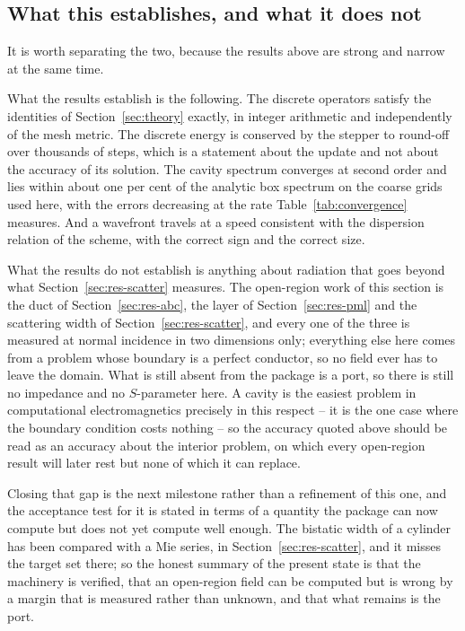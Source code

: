 \subsection{What this establishes, and what it does not}
\label{sec:res-scope}

It is worth separating the two, because the results above are strong and narrow at the same time.

What the results establish is the following. The discrete operators satisfy the identities of
Section~\ref{sec:theory} exactly, in integer arithmetic and independently of the mesh metric. The discrete
energy is conserved by the stepper to round-off over thousands of steps, which is a statement about the update
and not about the accuracy of its solution. The cavity spectrum converges at second order and lies within about
one per cent of the analytic box spectrum on the coarse grids used here, with the errors decreasing
at the rate Table~\ref{tab:convergence} measures. And a wavefront travels at a speed consistent with the
dispersion relation of the scheme, with the correct sign and the correct size.

What the results do not establish is anything about radiation that goes beyond what
Section~\ref{sec:res-scatter} measures. The open-region work of this section is the duct of
Section~\ref{sec:res-abc}, the layer of Section~\ref{sec:res-pml} and the scattering width of
Section~\ref{sec:res-scatter}, and every one of the three is measured at normal incidence in two dimensions only;
everything else here comes from a problem whose boundary is a perfect conductor, so no field ever has to leave the
domain. What is still absent from the package is a port, so there is still no impedance and no $S$-parameter
here. A cavity is the easiest problem in computational
electromagnetics precisely in this respect -- it is the one case where the boundary condition costs nothing --
so the accuracy quoted above should be read as an accuracy about the interior problem, on which every
open-region result will later rest but none of which it can replace.

Closing that gap is the next milestone rather than a refinement of this one, and the acceptance test for it is
stated in terms of a quantity the package can now compute but does not yet compute well enough. The bistatic
width of a cylinder has been compared with a Mie series, in Section~\ref{sec:res-scatter}, and it misses the
target set there; so the honest summary of the present state is that the machinery is verified, that an
open-region field can be computed but is wrong by a margin that is measured rather than unknown, and that what
remains is the port.
